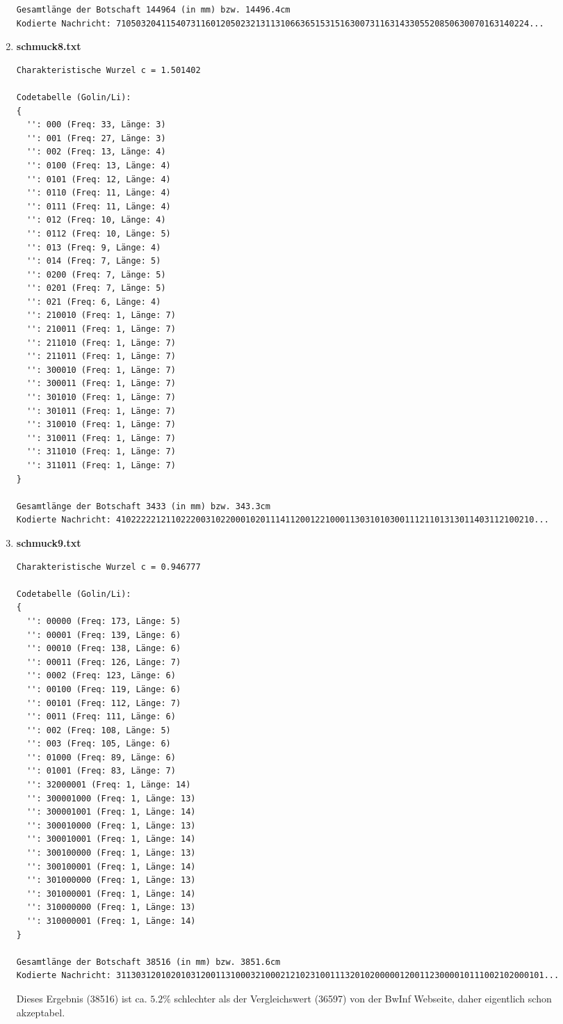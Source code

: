 \documentclass[a4paper,10pt,ngerman]{scrartcl}
\begin{document}
\begin{enumerate}
\begin{verbatim}
Gesamtlänge der Botschaft 144964 (in mm) bzw. 14496.4cm
Kodierte Nachricht: 71050320411540731160120502321311310663651531516300731163143305520850630070163140224...
\end{verbatim}
  \item \textbf{schmuck8.txt}
\begin{verbatim}
Charakteristische Wurzel c = 1.501402

Codetabelle (Golin/Li):
{
  '': 000 (Freq: 33, Länge: 3)
  '': 001 (Freq: 27, Länge: 3)
  '': 002 (Freq: 13, Länge: 4)
  '': 0100 (Freq: 13, Länge: 4)
  '': 0101 (Freq: 12, Länge: 4)
  '': 0110 (Freq: 11, Länge: 4)
  '': 0111 (Freq: 11, Länge: 4)
  '': 012 (Freq: 10, Länge: 4)
  '': 0112 (Freq: 10, Länge: 5)
  '': 013 (Freq: 9, Länge: 4)
  '': 014 (Freq: 7, Länge: 5)
  '': 0200 (Freq: 7, Länge: 5)
  '': 0201 (Freq: 7, Länge: 5)
  '': 021 (Freq: 6, Länge: 4)
  '': 210010 (Freq: 1, Länge: 7)
  '': 210011 (Freq: 1, Länge: 7)
  '': 211010 (Freq: 1, Länge: 7)
  '': 211011 (Freq: 1, Länge: 7)
  '': 300010 (Freq: 1, Länge: 7)
  '': 300011 (Freq: 1, Länge: 7)
  '': 301010 (Freq: 1, Länge: 7)
  '': 301011 (Freq: 1, Länge: 7)
  '': 310010 (Freq: 1, Länge: 7)
  '': 310011 (Freq: 1, Länge: 7)
  '': 311010 (Freq: 1, Länge: 7)
  '': 311011 (Freq: 1, Länge: 7)
}

Gesamtlänge der Botschaft 3433 (in mm) bzw. 343.3cm
Kodierte Nachricht: 410222221211022200310220001020111411200122100011303101030011121101313011403112100210...
\end{verbatim}
  \item \textbf{schmuck9.txt}
\begin{verbatim}
Charakteristische Wurzel c = 0.946777

Codetabelle (Golin/Li):
{
  '': 00000 (Freq: 173, Länge: 5)
  '': 00001 (Freq: 139, Länge: 6)
  '': 00010 (Freq: 138, Länge: 6)
  '': 00011 (Freq: 126, Länge: 7)
  '': 0002 (Freq: 123, Länge: 6)
  '': 00100 (Freq: 119, Länge: 6)
  '': 00101 (Freq: 112, Länge: 7)
  '': 0011 (Freq: 111, Länge: 6)
  '': 002 (Freq: 108, Länge: 5)
  '': 003 (Freq: 105, Länge: 6)
  '': 01000 (Freq: 89, Länge: 6)
  '': 01001 (Freq: 83, Länge: 7)
  '': 32000001 (Freq: 1, Länge: 14)
  '': 300001000 (Freq: 1, Länge: 13)
  '': 300001001 (Freq: 1, Länge: 14)
  '': 300010000 (Freq: 1, Länge: 13)
  '': 300010001 (Freq: 1, Länge: 14)
  '': 300100000 (Freq: 1, Länge: 13)
  '': 300100001 (Freq: 1, Länge: 14)
  '': 301000000 (Freq: 1, Länge: 13)
  '': 301000001 (Freq: 1, Länge: 14)
  '': 310000000 (Freq: 1, Länge: 13)
  '': 310000001 (Freq: 1, Länge: 14)
}

Gesamtlänge der Botschaft 38516 (in mm) bzw. 3851.6cm
Kodierte Nachricht: 31130312010201031200113100032100021210231001113201020000012001123000010111002102000101...
\end{verbatim}
Dieses Ergebnis (38516) ist ca. $5.2\%$ schlechter als der Vergleichswert (36597) von der BwInf Webseite, daher eigentlich schon akzeptabel.
\end{enumerate}
\end{document}
